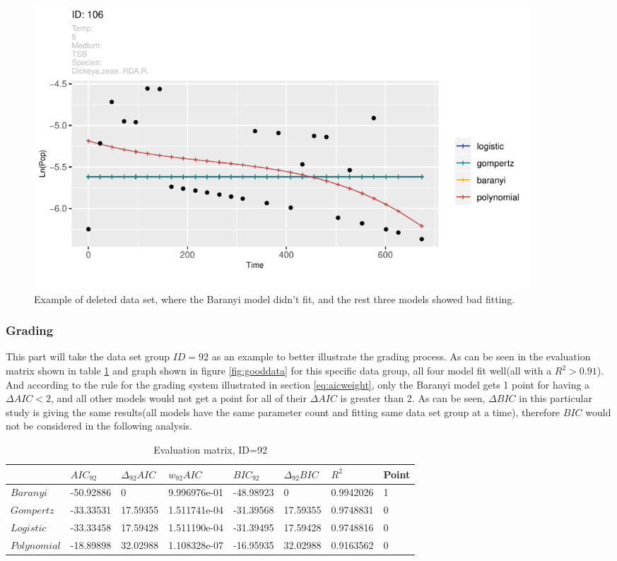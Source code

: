\documentclass[11pt]{article}
\begin{document}
\begin{figure}[!htbp]
    \centering
    \includegraphics[width=0.9\textwidth]{../Results/allPlots/106.pdf}
    \caption{Example of deleted data set, where the Baranyi model didn't fit, and the rest three models showed bad fitting.}
    \label{fig:baddata}
\end{figure}
\FloatBarrier

\subsubsection{Grading}
This part will take the data set group $\mathit{ID}=92$ as an example to better illustrate the grading process. As can be seen in the evaluation matrix shown in table \ref{tab: evaluation} and graph shown in figure \ref{fig:gooddata} for this specific data group, all four model fit well(all with a $R^2>0.91$). And according to the rule for the grading system illustrated in section \ref{eq:aicweight}, only the Baranyi model gets 1 point for having a $\Delta AIC < 2$, and all other models would not get a point for all of their $\Delta AIC$ is greater than 2. As can be seen, $\Delta BIC$ in this particular study is giving the same results(all models have the same parameter count and fitting same data set group at a time), therefore $BIC$ would not be considered in the following analysis.

\FloatBarrier
\begin{table}[!htbp]
\begin{tabularx}{\linewidth}{X X X X X X X X}
\toprule & ${AIC}_\mathit{92}$ & ${\Delta}_\mathit{92} AIC$ & ${w}_\mathit{92} AIC$ &  ${BIC}_\mathit{92}$ & ${\Delta}_\mathit{92} BIC$ & $R^2$ & Point\\
\midrule
$Baranyi$ & -50.92886 & 0 & 9.996976e-01 & -48.98923 & 0 & 0.9942026 & 1 \\
$Gompertz$ & -33.33531 & 17.59355 & 1.511741e-04 & -31.39568 & 17.59355 & 0.9748831 & 0 \\
$Logistic$ & -33.33458 & 17.59428 & 1.511190e-04 & -31.39495 & 17.59428 & 0.9748816 & 0 \\
$Polynomial$ & -18.89898 & 32.02988 & 1.108328e-07 & -16.95935 & 32.02988 & 0.9163562 & 0\\
\bottomrule
\end{tabularx}
\caption{Evaluation matrix, ID=92}
\label{tab: evaluation}
\end{table}          
\FloatBarrier
\end{document}
